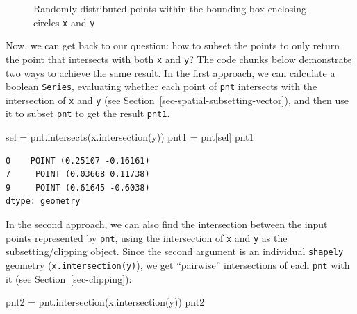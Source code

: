 \documentclass[
  letterpaper,
]{krantz}
\newenvironment{Shaded}{\begin{snugshade}}{\end{snugshade}}
\newcommand{\NormalTok}[1]{\textcolor[rgb]{0.00,0.23,0.31}{#1}}
\newcommand{\OperatorTok}[1]{\textcolor[rgb]{0.37,0.37,0.37}{#1}}
\begin{document}
\begin{figure}[H]


\caption{\label{fig-random-points}Randomly distributed points within the
bounding box enclosing circles \texttt{x} and \texttt{y}}

\end{figure}%

Now, we can get back to our question: how to subset the points to only
return the point that intersects with both \texttt{x} and \texttt{y}?
The code chunks below demonstrate two ways to achieve the same result.
In the first approach, we can calculate a boolean \texttt{Series},
evaluating whether each point of \texttt{pnt} intersects with the
intersection of \texttt{x} and \texttt{y} (see
Section~\ref{sec-spatial-subsetting-vector}), and then use it to subset
\texttt{pnt} to get the result \texttt{pnt1}.

\begin{Shaded}
\begin{Highlighting}[]
\NormalTok{sel }\OperatorTok{=}\NormalTok{ pnt.intersects(x.intersection(y))}
\NormalTok{pnt1 }\OperatorTok{=}\NormalTok{ pnt[sel]}
\NormalTok{pnt1}
\end{Highlighting}
\end{Shaded}

\begin{verbatim}
0    POINT (0.25107 -0.16161)
7     POINT (0.03668 0.11738)
9     POINT (0.61645 -0.6038)
dtype: geometry
\end{verbatim}

In the second approach, we can also find the intersection between the
input points represented by \texttt{pnt}, using the intersection of
\texttt{x} and \texttt{y} as the subsetting/clipping object. Since the
second argument is an individual \texttt{shapely} geometry
(\texttt{x.intersection(y)}), we get ``pairwise'' intersections of each
\texttt{pnt} with it (see Section~\ref{sec-clipping}):

\begin{Shaded}
\begin{Highlighting}[]
\NormalTok{pnt2 }\OperatorTok{=}\NormalTok{ pnt.intersection(x.intersection(y))}
\NormalTok{pnt2}
\end{Highlighting}
\end{Shaded}
\end{document}
